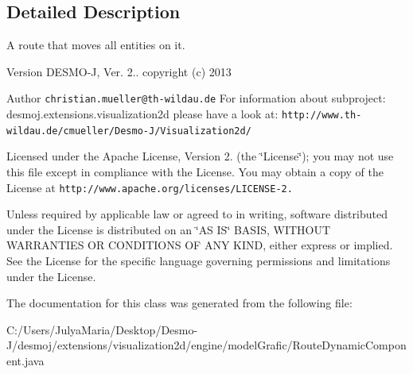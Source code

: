 \subsection{Detailed Description}
A route that moves all entities on it.

\begin{DoxyVersion}{Version}
D\-E\-S\-M\-O-\/\-J, Ver. 2.. copyright (c) 2013 
\end{DoxyVersion}
\begin{DoxyAuthor}{Author}
{\tt christian.\-mueller@th-\/wildau.\-de} For information about subproject\-: desmoj.\-extensions.\-visualization2d please have a look at\-: {\tt http\-://www.\-th-\/wildau.\-de/cmueller/\-Desmo-\/\-J/\-Visualization2d/}
\end{DoxyAuthor}
Licensed under the Apache License, Version 2. (the \char`\"{}\-License\char`\"{}); you may not use this file except in compliance with the License. You may obtain a copy of the License at {\tt http\-://www.\-apache.\-org/licenses/\-L\-I\-C\-E\-N\-S\-E-\/2.}

Unless required by applicable law or agreed to in writing, software distributed under the License is distributed on an \char`\"{}\-A\-S I\-S\char`\"{} B\-A\-S\-I\-S, W\-I\-T\-H\-O\-U\-T W\-A\-R\-R\-A\-N\-T\-I\-E\-S O\-R C\-O\-N\-D\-I\-T\-I\-O\-N\-S O\-F A\-N\-Y K\-I\-N\-D, either express or implied. See the License for the specific language governing permissions and limitations under the License. 

The documentation for this class was generated from the following file\-:\begin{DoxyCompactItemize}
\item 
C\-:/\-Users/\-Julya\-Maria/\-Desktop/\-Desmo-\/\-J/desmoj/extensions/visualization2d/engine/model\-Grafic/Route\-Dynamic\-Component.\-java\end{DoxyCompactItemize}
